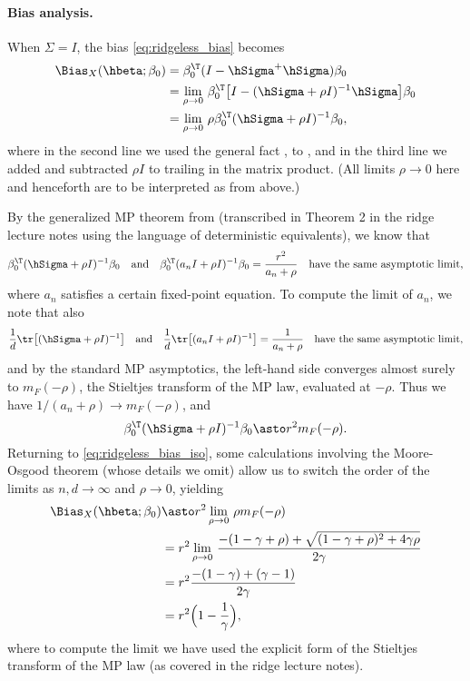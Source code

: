 \documentclass{article}
\begin{document}
\paragraph{Bias analysis.}

When $\Sigma = I$, the bias \eqref{eq:ridgeless_bias} becomes 
\begin{align}
\nonumber
\Bias_X(\hbeta; \beta_0) 
&= \beta_0^\T (I - \hSigma^+ \hSigma) \beta_0 \\ 
\nonumber
&= \lim_{\rho \to 0} \, \beta_0^\T \big[ I - (\hSigma + \rho I)^{-1} \hSigma  
  \big] \beta_0 \\   
\label{eq:ridgeless_bias_iso}
&= \lim_{\rho \to 0} \, \rho \beta_0^\T (\hSigma + \rho I)^{-1} \beta_0,  
\end{align}
where in the second line we used the general fact , to , and in the third line we added and subtracted $\rho I$ to
trailing \smash{$\hSigma$} in the matrix product. (All limits $\rho \to 0$ here  
and henceforth are to be interpreted as from above.) 

By the generalized MP theorem from \citet{rubio2011spectral} (transcribed in
Theorem 2 in the ridge lecture notes using the language of deterministic
equivalents), we know that  
\[
\beta_0^\T (\hSigma + \rho I)^{-1} \beta_0 \quad \text{and} \quad 
\beta_0^\T (a_n I + \rho I)^{-1} \beta_0 = \frac{r^2}{a_n + \rho} \quad
\text{have the same asymptotic limit},
\]
where $a_n$ satisfies a certain fixed-point equation. To compute the limit of
$a_n$, we note that also
\[
\frac{1}{d} \tr \big[ (\hSigma + \rho I)^{-1} \big] \quad \text{and} \quad  
\frac{1}{d} \tr \big[ (a_n I + \rho I)^{-1} \big] = \frac{1}{a_n + \rho}
\quad \text{have the same asymptotic limit},  
\]
and by the standard MP asymptotics, the left-hand side converges almost surely
to $m_F(-\rho)$, the Stieltjes transform of the MP law, evaluated at
$-\rho$. Thus we have $1/(a_n + \rho) \to m_F(-\rho)$, and    
\[
\beta_0^\T (\hSigma + \rho I)^{-1} \beta_0 \asto r^2 m_F(-\rho). 
\]
Returning to \eqref{eq:ridgeless_bias_iso}, some calculations involving the
Moore-Osgood theorem (whose details we omit) allow us to switch the order of the
limits as $n,d \to \infty$ and $\rho \to 0$, yielding
\begin{align}
\nonumber
\Bias_X(\hbeta; \beta_0) &\asto r^2 \lim_{\rho \to 0} \, \rho m_F(-\rho) \\
\nonumber
&= r^2 \lim_{\rho \to 0} \, \frac{-(1 - \gamma + \rho) + \sqrt{(1 - \gamma +
  \rho)^2 + 4 \gamma \rho}}{2 \gamma} \\
\nonumber
&= r^2 \frac{-(1-\gamma) + (\gamma-1)}{2 \gamma} \\
\label{eq:ridgeless_bias_iso_limit}
&= r^2 \Big( 1- \frac{1}{\gamma} \Big),
\end{align}
where to compute the limit we have used the explicit form of the Stieltjes
transform of the MP law (as covered in the ridge lecture notes).
\end{document}
